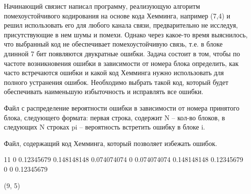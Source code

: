 
Начинающий связист написал программу, реализующую алгоритм помехоустойчивого кодирования на основе кода Хемминга, например (7,4) и решил использовать его для любого канала связи, предварительно не исследуя, присутствующие в нем шумы и помехи. Однако через какое-то время выяснилось, что выбранный код не обеспечивает помехоустойчивую связь, т.е. в блоке длинной 7 бит появляются двукратные ошибки. Задача состоит в том, чтобы по частоте возникновения ошибки в зависимости от номера блока определить, как часто встречаются ошибки и какой код Хемминга нужно использовать для полного устранения ошибок. Необходимо выбрать такой код, который будет обеспечивать наименьшую избыточность и исправлять все ошибки.


Файл с распределение вероятности ошибки в зависимости от номера принятого блока, следующего формата: первая строка, содержит N – кол-во блоков, в следующих N строках pi – вероятность встретить ошибку в блоке i.

\outputfmtSection

Файл, содержащий код Хемминга, который позволяет избежать ошибок.


\begin{myverbbox}[\small]{\vinput}
    11
    0
    0.12345679
    0.148148148
    0.074074074
    0
    0.074074074
    0.148148148
    0.12345679
    0
    0
    0.12345679    
\end{myverbbox}
\begin{myverbbox}[\small]{\voutput}
    (9, 5)
\end{myverbbox}
